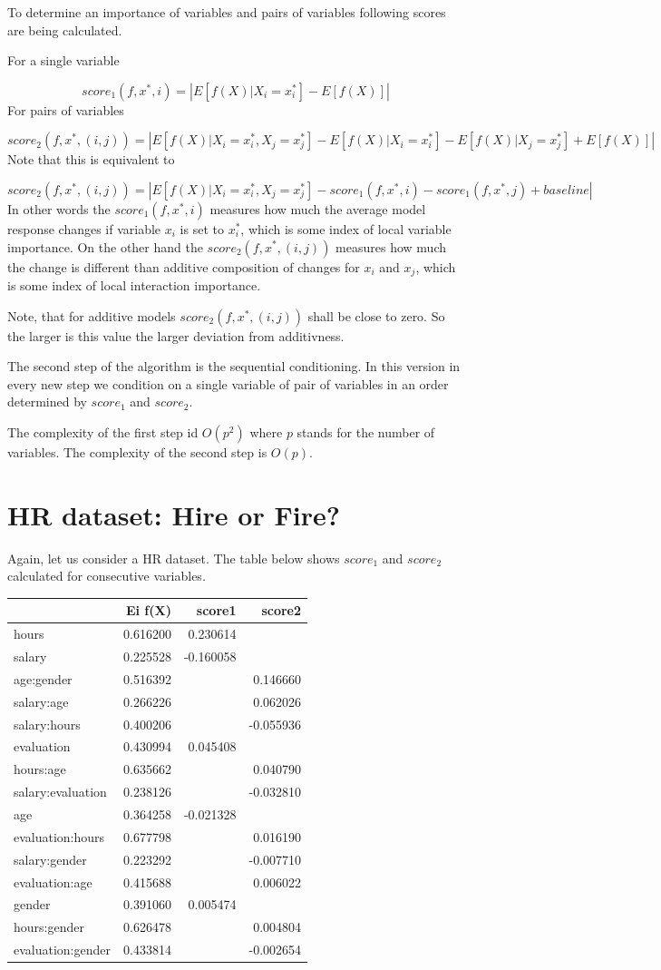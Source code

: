 \documentclass[]{book}
\theoremstyle{definition}
\theoremstyle{definition}
\theoremstyle{definition}
\theoremstyle{remark}
\begin{document}
To determine an importance of variables and pairs of variables following
scores are being calculated.

For a single variable

\[
score_1(f, x^*, i) = \left| E [f(X)|X_i = x^*_i]  - E [f(X)]\right|
\] For pairs of variables

\[
score_2(f, x^*, (i,j)) = \left| E [f(X)|X_i = x^*_i, X_j = x^*_j] - E [f(X)|X_i = x^*_i] - E [f(X)| X_j = x^*_j]+ E [f(X)] \right|
\] Note that this is equivalent to

\[
score_2(f, x^*, (i,j)) = \left| E [f(X)|X_i = x^*_i, X_j = x^*_j] - score_1 (f, x^*, i) - score_1 (f, x^*, j) + baseline \right|
\] In other words the \(score_1(f, x^*, i)\) measures how much the
average model response changes if variable \(x_i\) is set to \(x_i^*\),
which is some index of local variable importance. On the other hand the
\(score_2(f, x^*, (i,j))\) measures how much the change is different
than additive composition of changes for \(x_i\) and \(x_j\), which is
some index of local interaction importance.

Note, that for additive models \(score_2(f, x^*, (i,j))\) shall be close
to zero. So the larger is this value the larger deviation from
additivness.

The second step of the algorithm is the sequential conditioning. In this
version in every new step we condition on a single variable of pair of
variables in an order determined by \(score_1\) and \(score_2\).

The complexity of the first step id \(O(p^2)\) where \(p\) stands for
the number of variables. The complexity of the second step is \(O(p)\).

\hypertarget{hr-dataset-hire-or-fire-1}{%
\section{HR dataset: Hire or Fire?}\label{hr-dataset-hire-or-fire-1}}

Again, let us consider a HR dataset. The table below shows \(score_1\)
and \(score_2\) calculated for consecutive variables.

\begin{longtable}[]{@{}lrrr@{}}
\toprule
& Ei f(X) & score1 & score2\tabularnewline
\midrule
\endhead
hours & 0.616200 & 0.230614 &\tabularnewline
salary & 0.225528 & -0.160058 &\tabularnewline
age:gender & 0.516392 & & 0.146660\tabularnewline
salary:age & 0.266226 & & 0.062026\tabularnewline
salary:hours & 0.400206 & & -0.055936\tabularnewline
evaluation & 0.430994 & 0.045408 &\tabularnewline
hours:age & 0.635662 & & 0.040790\tabularnewline
salary:evaluation & 0.238126 & & -0.032810\tabularnewline
age & 0.364258 & -0.021328 &\tabularnewline
evaluation:hours & 0.677798 & & 0.016190\tabularnewline
salary:gender & 0.223292 & & -0.007710\tabularnewline
evaluation:age & 0.415688 & & 0.006022\tabularnewline
gender & 0.391060 & 0.005474 &\tabularnewline
hours:gender & 0.626478 & & 0.004804\tabularnewline
evaluation:gender & 0.433814 & & -0.002654\tabularnewline
\bottomrule
\end{longtable}
\end{document}
